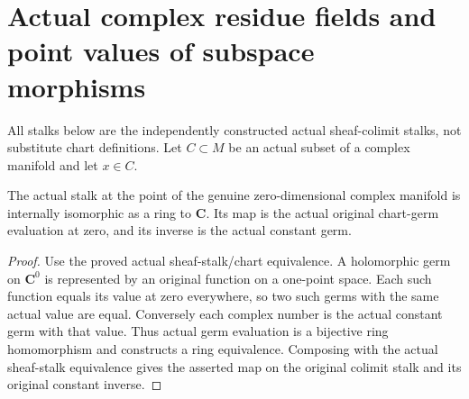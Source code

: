 \section{Actual complex residue fields and point values of subspace morphisms}
\label{sec:hironaka-actual-analytic-subspace-residue}

All stalks below are the independently constructed actual sheaf-colimit
stalks, not substitute chart definitions. Let $C\subset M$ be an actual
subset of a complex manifold and let $x\in C$.

\begin{theorem}
\label{hir:actual-analytic-complex-point-stalk-field}
\leanok
The actual stalk at the point of the genuine zero-dimensional complex
manifold is internally isomorphic as a ring to $\mathbf C$. Its map is
the actual original chart-germ evaluation at zero, and its inverse is
the actual constant germ.
\end{theorem}
\begin{proof}
Use the proved actual sheaf-stalk/chart equivalence. A holomorphic germ
on $\mathbf C^0$ is represented by an original function on a one-point
space. Each such function equals its value at zero everywhere, so two
such germs with the same actual value are equal. Conversely each
complex number is the actual constant germ with that value. Thus
actual germ evaluation is a bijective ring homomorphism and constructs
a ring equivalence. Composing with the actual sheaf-stalk equivalence
gives the asserted map on the original colimit stalk and its original
constant inverse.
\end{proof}


